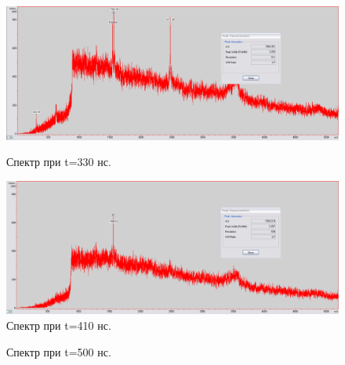 \documentclass[12pt]{article}
\begin{document}
\begin{flushleft}
\begin{figure}[!h]
\begin{center}
\begin{minipage}[h]{0.4\linewidth}
\includegraphics[width=1.2\linewidth]{17}
\caption{Спектр при t=330 нс.} %
\label{ris:experimoriginal} %
\end{minipage}
\hfill 
\begin{minipage}[h]{0.4\linewidth}
\includegraphics[width=1.2\linewidth]{18}
\caption{Спектр при t=410 нс.}
\label{ris:experimcoded}
\end{minipage}
\end{center}
\end{figure}

\begin{figure}[!h]
\caption{Спектр при t=500 нс.}
\label{ris:image}
\end{figure}


\end{flushleft}
\end{document}
